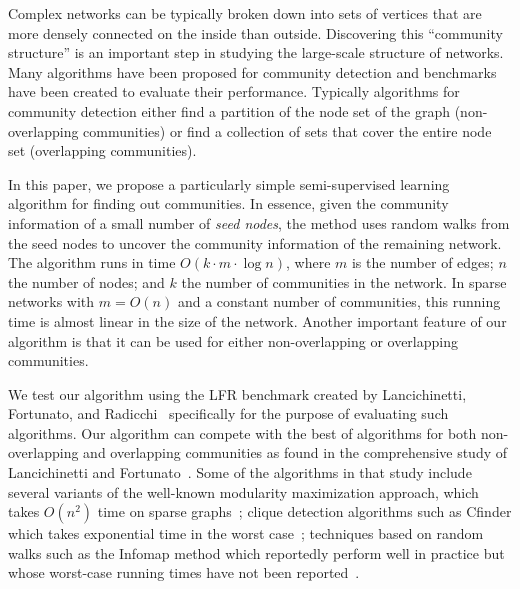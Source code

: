 Complex networks can be typically broken down into sets of vertices that are
more densely connected on the inside than outside. Discovering this ``community
structure'' is an important step in studying the large-scale structure of
networks. Many algorithms have been proposed for community detection and
benchmarks have been created to evaluate their performance. Typically algorithms
for community detection either find a partition of the node set of the graph
(non-overlapping communities) or find a collection of sets that cover the entire
node set (overlapping communities). 

In this paper, we propose a particularly simple semi-supervised learning
algorithm for finding out communities. In essence, given the community
information of a small number of \emph{seed nodes}, the method uses random walks
from the seed nodes to uncover the community information of the remaining
network.  The algorithm runs in time $O(k \cdot m \cdot \log n)$, where $m$ is
the number of edges; $n$ the number of nodes; and $k$ the number of communities
in the network.  In sparse networks with $m = O(n)$ and a constant number of
communities, this running time is almost linear in the size of the network.
Another important feature of our algorithm is that it can be used for either
non-overlapping or overlapping communities. 

We test our algorithm using the LFR benchmark created by Lancichinetti,
Fortunato, and Radicchi~\cite{LFR08} specifically for the purpose of evaluating
such algorithms. Our algorithm can compete with the best of algorithms for both
non-overlapping and overlapping communities as found in the comprehensive study
of Lancichinetti and Fortunato~\cite{LF09}. Some of the algorithms in that study
include several variants of the well-known modularity maximization approach,
which takes $O(n^2)$ time on sparse graphs~\cite{RCC04}; clique detection
algorithms such as Cfinder which takes exponential time in the worst
case~\cite{PDFV05}; techniques based on random walks such as the Infomap method
which reportedly perform well in practice but whose  worst-case running times
have not been reported~\cite{RB08}. 
